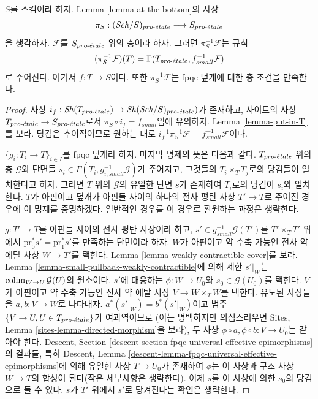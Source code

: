 \begin{lemma}
\label{lemma-describe-pullback}
$S$를 스킴이라 하자. Lemma \ref{lemma-at-the-bottom}의 사상
$$
\pi_S : (\mathit{Sch}/S)_{pro\text{-}\acute{e}tale} \longrightarrow S_{pro\text{-}\acute{e}tale}
$$
을 생각하자. $\mathcal{F}$를 $S_{pro\text{-}\acute{e}tale}$ 위의 층이라 하자. 그러면
$\pi_S^{-1}\mathcal{F}$는 규칙
$$
(\pi_S^{-1}\mathcal{F})(T) = \Gamma(T_{pro\text{-}\acute{e}tale}, f_{small}^{-1}\mathcal{F})
$$
로 주어진다. 여기서 $f : T \to S$이다. 또한
$\pi_S^{-1}\mathcal{F}$는 fpqc 덮개에 대한 층 조건을 만족한다.
\end{lemma}

\begin{proof}
사상 $i_f : \mathop{\mathit{Sh}}\nolimits(T_{pro\text{-}\acute{e}tale}) \to \mathop{\mathit{Sh}}\nolimits(\mathit{Sch}/S)_{pro\text{-}\acute{e}tale})$가 존재하고,
사이트의 사상 $T_{pro\text{-}\acute{e}tale} \to S_{pro\text{-}\acute{e}tale}$로서
$\pi_S \circ i_f = f_{small}$임에 유의하자. Lemma
\ref{lemma-put-in-T}를 보라. 당김은 추이적이므로 원하는 대로
$i_f^{-1} \pi_S^{-1}\mathcal{F} = f_{small}^{-1}\mathcal{F}$이다.

\medskip\noindent
$\{g_i : T_i \to T\}_{i \in I}$를 fpqc 덮개라 하자. 마지막 명제의
뜻은 다음과 같다. $T_{pro\text{-}\acute{e}tale}$ 위의 층 $\mathcal{G}$와 단면들
$s_i \in \Gamma(T_i, g_{i, small}^{-1}\mathcal{G})$가 주어지고,
그것들의 $T_i \times_T T_j$로의 당김들이 일치한다고 하자. 그러면
$T$ 위의 $\mathcal{G}$의 유일한 단면 $s$가 존재하여 $T_i$로의 당김이
$s_i$와 일치한다. $T$가 아핀이고 덮개가 아핀들 사이의 하나의 전사
평탄 사상 $T' \to T$로 주어진 경우에 이 명제를 증명하겠다. 일반적인
경우를 이 경우로 환원하는 과정은 생략한다.

\medskip\noindent
$g : T' \to T$를 아핀들 사이의 전사 평탄 사상이라 하고,
$s' \in g_{small}^{-1}\mathcal{G}(T')$를
$T' \times_T T'$ 위에서 $\text{pr}_0^*s' = \text{pr}_1^*s'$를 만족하는
단면이라 하자. $W$가 아핀이고 약 수축 가능인 전사 약 에탈 사상
$W \to T'$를 택한다. Lemma \ref{lemma-weakly-contractible-cover}를
보라. Lemma \ref{lemma-small-pullback-weakly-contractible}에 의해 제한
$s'|_W$는 $\mathop{\mathrm{colim}}\nolimits_{W \to U} \mathcal{G}(U)$의 원소이다. $s'$에
대응하는 $\phi : W \to U_0$와 $s_0 \in \mathcal{G}(U_0)$를 택한다.
$V$가 아핀이고 약 수축 가능인 전사 약 에탈 사상
$V \to W \times_T W$를 택한다. 유도된 사상들을
$a, b : V \to W$로 나타내자.
$a^*(s'|_W) = b^*(s'|_W)$이고 범주
$\{V \to U, U \in T_{pro\text{-}\acute{e}tale}\}$가 여과역이므로
(이는 명백하지만 의심스러우면 Sites, Lemma
\ref{sites-lemma-directed-morphism}을 보라), 두 사상
$\phi \circ a , \phi \circ b : V \to U_0$는 같아야 한다.
Descent, Section
\ref{descent-section-fpqc-universal-effective-epimorphisms}의 결과들,
특히 Descent, Lemma
\ref{descent-lemma-fpqc-universal-effective-epimorphisms}에 의해 유일한
사상 $T \to U_0$가 존재하여 $\phi$는 이 사상과 구조 사상
$W \to T$의 합성이 된다(작은 세부사항은 생략한다). 이제 $s$를 이
사상에 의한 $s_0$의 당김으로 둘 수 있다. $s$가 $T'$ 위에서 $s'$로
당겨진다는 확인은 생략한다.
\end{proof}








